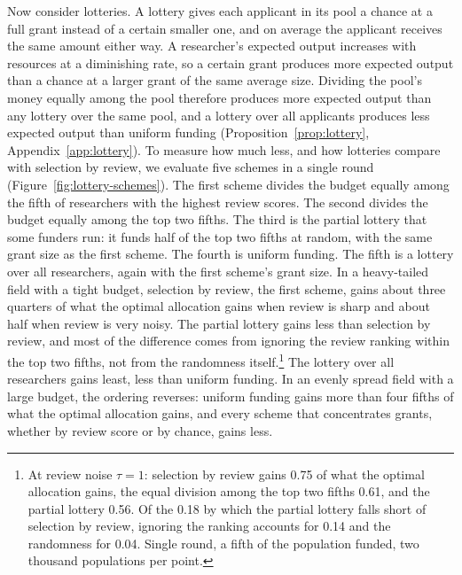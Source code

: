 \documentclass[article, 11pt, reqno]{amsart}
\theoremstyle{named}
\begin{document}
Now consider lotteries. A lottery gives each applicant in its pool a chance at a full
grant instead of a certain smaller one, and on average the applicant receives the
same amount either way. A researcher's expected output increases with resources at a
diminishing rate, so a certain grant produces more expected output than a chance at a
larger grant of the same average size. Dividing the pool's money equally among the
pool therefore produces more expected output than any lottery over the same pool, and
a lottery over all applicants produces less expected output than uniform funding
(Proposition~\ref{prop:lottery}, Appendix~\ref{app:lottery}). To measure how much
less, and how lotteries compare with selection by review, we evaluate five schemes in
a single round (Figure~\ref{fig:lottery-schemes}). The first scheme divides the budget
equally among the fifth of researchers with the highest review scores. The second
divides the budget equally among the top two fifths. The third is the partial lottery
that some funders run: it funds half of the top two fifths at random, with the same
grant size as the first scheme. The fourth is uniform funding. The fifth is a lottery
over all researchers, again with the first scheme's grant size. In a heavy-tailed
field with a tight budget, selection by review, the first scheme, gains about three
quarters of what the optimal allocation gains when review is sharp and about half
when review is very noisy. The partial lottery gains less than selection by review,
and most of the difference comes from ignoring the review ranking within the top two
fifths, not from the randomness itself.\footnote{At review noise $\tau = 1$: selection
by review gains 0.75 of what the optimal allocation gains, the equal division among
the top two fifths 0.61, and the partial lottery 0.56. Of the 0.18 by which the
partial lottery falls short of selection by review, ignoring the ranking accounts for
0.14 and the randomness for 0.04. Single round, a fifth of the population funded, two
thousand populations per point.} The lottery over all researchers gains least, less
than uniform funding. In an evenly spread field with a large budget, the ordering
reverses: uniform funding gains more than four fifths of what the optimal allocation
gains, and every scheme that concentrates grants, whether by review score or by
chance, gains less.


\end{document}
